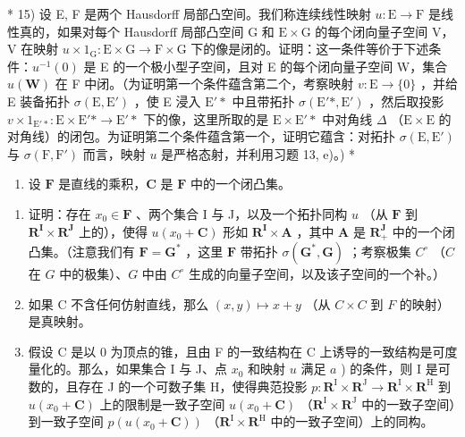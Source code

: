 * 15) 设 E, F 是两个 Hausdorff 局部凸空间。我们称连续线性映射 \(u: \mathrm{E} \to \mathrm{F}\) 是线性真的，如果对每个 Hausdorff 局部凸空间 G 和 \(\mathrm{E} \times \mathrm{G}\) 的每个闭向量子空间 V，V 在映射 \(u \times 1_{\mathrm{G}}: \mathrm{E} \times \mathrm{G} \to \mathrm{F} \times \mathrm{G}\) 下的像是闭的。证明：这一条件等价于下述条件：\(u^{-1}(0)\) 是 E 的一个极小型子空间，且对 E 的每个闭向量子空间 W，集合 \(u(\mathbf{W})\) 在 F 中闭。（为证明第一个条件蕴含第二个，考察映射 \(v: \mathrm{E} \to \{0\}\) ，并给 E 装备拓扑 \(\sigma(\mathrm{E}, \mathrm{E}')\) ，使 E 浸入 \(\mathrm{E}'*\) 中且带拓扑 \(\sigma(\mathrm{E}'*, \mathrm{E}')\) ，然后取投影 \(v \times 1_{\mathrm{E}'*}: \mathrm{E} \times \mathrm{E}'* \to \mathrm{E}'*\) 下的像，这里所取的是 \(\mathrm{E} \times \mathrm{E}'*\) 中对角线 \(\Delta\) （\(\mathrm{E} \times \mathrm{E}\) 的对角线）的闭包。为证明第二个条件蕴含第一个，证明它蕴含：对拓扑 \(\sigma(\mathrm{E}, \mathrm{E}')\) 与 \(\sigma(\mathrm{F}, \mathrm{F}')\) 而言，映射 \(u\) 是严格态射，并利用习题 13, e)。) *

\begin{enumerate}
\def\labelenumi{\arabic{enumi})}
\setcounter{enumi}{15}
\tightlist
\item
  设 \(\mathbf{F}\) 是直线的乘积，\(\mathbf{C}\) 是 \(\mathbf{F}\) 中的一个闭凸集。
\end{enumerate}

\begin{enumerate}
\def\labelenumi{\alph{enumi})}
\item
  证明：存在 \(x_0 \in \mathbf{F}\) 、两个集合 I 与 J，以及一个拓扑同构 \(u\) （从 \(\mathbf{F}\) 到 \(\mathbf{R}^{\mathbf{I}} \times \mathbf{R}^{\mathbf{J}}\) 上的），使得 \(u(x_0 + \mathbf{C})\) 形如 \(\mathbf{R}^{\mathbf{I}} \times \mathbf{A}\) ，其中 \(\mathbf{A}\) 是 \(\mathbf{R}_+^{\mathbf{J}}\) 中的一个闭凸集。（注意我们有 \(\mathbf{F} = \mathbf{G}^*\) ，这里 \(\mathbf{F}\) 带拓扑 \(\sigma(\mathbf{G}^*, \mathbf{G})\) ；考察极集 \(C^\circ\) （\(C\) 在 \(G\) 中的极集）、\(G\) 中由 \(C^\circ\) 生成的向量子空间，以及该子空间的一个补。）
\item
  如果 C 不含任何仿射直线，那么 \((x, y) \mapsto x + y\) （从 \(C \times C\) 到 \(F\) 的映射）是真映射。
\item
  假设 C 是以 0 为顶点的锥，且由 F 的一致结构在 C 上诱导的一致结构是可度量化的。那么，如果集合 I 与 J、点 \(x_0\) 和映射 \(u\) 满足 \(a\) ) 的条件，则 I 是可数的，且存在 J 的一个可数子集 H，使得典范投影 \(p: \mathbf{R}^{\mathrm{I}} \times \mathbf{R}^{\mathrm{J}} \to \mathbf{R}^{\mathrm{I}} \times \mathbf{R}^{\mathrm{H}}\) 到 \(u(x_0 + \mathbf{C})\) 上的限制是一致子空间 \(u(x_0 + \mathbf{C})\) （\(\mathbf{R}^{\mathrm{I}} \times \mathbf{R}^{\mathrm{J}}\) 中的一致子空间）到一致子空间 \(p(u(x_0 + \mathbf{C}))\) （\(\mathbf{R}^{\mathrm{I}} \times \mathbf{R}^{\mathrm{H}}\) 中的一致子空间）上的同构。
\end{enumerate}

